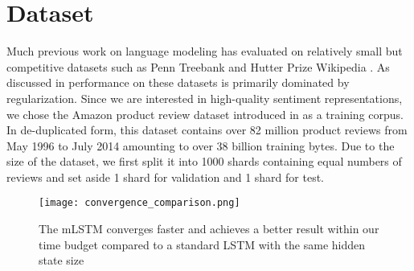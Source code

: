 \documentclass{article}
\begin{document}
\section{Dataset}
Much previous work on language modeling has evaluated on relatively small but competitive datasets such as Penn Treebank \cite{marcus1993building} and Hutter Prize Wikipedia \cite{hutterhuman}. As discussed in \citet{jozefowicz2016exploring} performance on these datasets is primarily dominated by regularization. Since we are interested in high-quality sentiment representations, we chose the Amazon product review dataset introduced in \citet{mcauley2015inferring} as a training corpus. In de-duplicated form, this dataset contains over 82 million product reviews from May 1996 to July 2014 amounting to over 38 billion training bytes. Due to the size of the dataset, we first split it into 1000 shards containing equal numbers of reviews and set aside 1 shard for validation and 1 shard for test.

\begin{figure}[h]
\vskip 0.2in
\begin{center}
\centerline{\texttt{[image: convergence\_comparison.png]}}
\caption{The mLSTM converges faster and achieves a better result within our time budget compared to a standard LSTM with the same hidden state size}
\label{convergence comparison}
\end{center}
\vskip -0.2in
\end{figure} 
\end{document}

